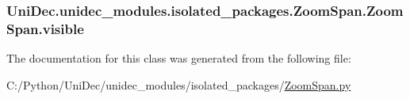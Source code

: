 \subsubsection[{visible}]{\setlength{\rightskip}{0pt plus 5cm}Uni\+Dec.\+unidec\+\_\+modules.\+isolated\+\_\+packages.\+Zoom\+Span.\+Zoom\+Span.\+visible}\label{class_uni_dec_1_1unidec__modules_1_1isolated__packages_1_1_zoom_span_1_1_zoom_span_ae3392f4ff7c923aa9a650db2518efd7e}


The documentation for this class was generated from the following file\+:\begin{DoxyCompactItemize}
\item 
C\+:/\+Python/\+Uni\+Dec/unidec\+\_\+modules/isolated\+\_\+packages/\hyperlink{_zoom_span_8py}{Zoom\+Span.\+py}\end{DoxyCompactItemize}
